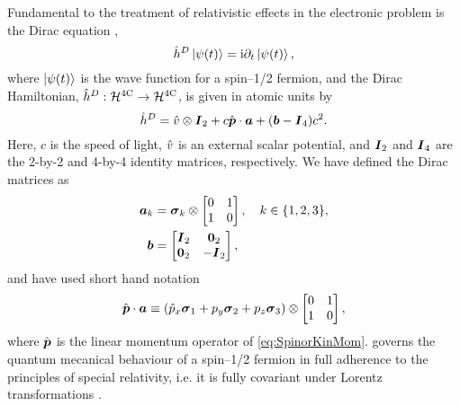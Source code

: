 Fundamental to the treatment of relativistic effects in the electronic problem is the 
Dirac equation ,
\begin{equation}
\label{eq:DiracEq}
\hat{h}^D \left\vert \psi (t) \right\rangle = \mathrm i \partial_t \left\vert \psi (t) \right\rangle,
\end{equation}
where $\left\vert \psi (t) \right\rangle$ is the wave function for a spin--1/2 fermion, and the Dirac Hamiltonian,
$\hat{h}^D : \mathcal{H}^{\mathrm{4C}} \rightarrow \mathcal{H}^{\mathrm{4C}}$, is given in atomic units by
\begin{equation}
\label{eq:DiracHam}
\hat{h}^D = \hat{v} \otimes \boldsymbol{I}_2 + c \hat{\boldsymbol{p}} \cdot \boldsymbol{a} + (\boldsymbol{b} - \boldsymbol{I}_4)c^2.
\end{equation}
Here, $c$ is the speed of light, $\hat{v}$ is an external scalar potential, and $\boldsymbol{I}_2$ and $\boldsymbol{I}_4$ are the 2-by-2 and 4-by-4 identity matrices, respectively. 
We have defined the Dirac matrices as
\begin{subequations}
\begin{align}
  \label{eq:DiracMat}
  \boldsymbol{a}_k &= \boldsymbol{\sigma}_{k} \otimes \begin{bmatrix} 0 & 1 \\ 1 & 0 \end{bmatrix}, \quad k \in \{1,2,3\},\\
  \boldsymbol{b} &= \begin{bmatrix} \boldsymbol{I}_2 & \boldsymbol{0}_2 \\ \boldsymbol{0}_2 & -\boldsymbol{I}_2 \end{bmatrix},
\end{align}
\end{subequations}
and have used short hand notation
\begin{equation}
\hat{\boldsymbol{p}} \cdot \boldsymbol{a} \equiv \left(\hat{p}_x \boldsymbol{\sigma}_{1} + p_y \boldsymbol{\sigma}_{2} + p_z \boldsymbol{\sigma}_{3}  \right) \otimes  
  \begin{bmatrix} 0 & 1 \\ 1 & 0 \end{bmatrix},
\end{equation}
where $\hat{\boldsymbol{p}}$ is the linear momentum operator of \cref{eq:SpinorKinMom}.  governs
the quantum mecanical behaviour of a spin--1/2 fermion in full adherence to the principles of special
relativity, i.e. it is fully covariant under Lorentz transformations .


